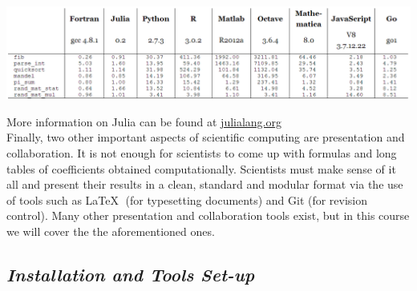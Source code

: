\documentclass[11pt,a4paper,oneside]{report}
\begin{document}
\begin{center}
\includegraphics[width=6in]{benchmarksJulia.png}
\end{center}

More information on Julia can be found at \href{http://julialang.org/}{julialang.org}\\

Finally, two other important aspects of scientific computing are presentation and collaboration. It is not enough for scientists to come up with formulas and long tables of coefficients obtained computationally. Scientists must make sense of it all and present their results in a clean, standard and modular format via the use of tools such as \LaTeX $\;$ (for typesetting documents) and Git (for revision control). Many other presentation and collaboration tools exist, but in this course we will cover the the aforementioned ones.\\

{\center\color{magenta}
\subsection*{{\it\huge Installation and Tools Set-up}}}
\end{document}
